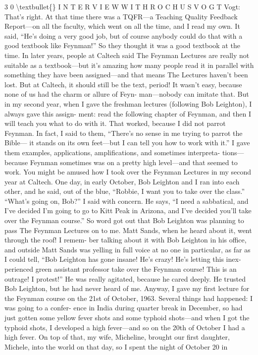 \documentclass[10pt,oneside]{article}
\begin{document}
3 0 \textbackslash{}textbullet\{\} I N T E R V I E W  W I T H  R O C H U S  V O G T Vogt: That’s right. At that time there was a TQFR---a Teaching Quality Feedback Report---on all the faculty, which went on all the time, and I read my own. It said, “He’s doing a very good job, but of course anybody could do that with a good textbook like Feynman!” So they thought it was a good textbook at the time. In later years, people at Caltech said The Feynman Lectures are really not suitable as a textbook---but it’s amazing how many people read it in parallel with something they have been assigned---and that means The Lectures haven’t been lost. But at Caltech, it should still be the text, period! It wasn’t easy, because none of us had the charm or allure of Feyn- man---nobody can imitate that. But in my second year, when I gave the freshman lectures (following Bob Leighton), I always gave this assign- ment: read the following chapter of Feynman, and then I will teach you what to do with it. That worked, because I did not parrot Feynman. In fact, I said to them, “There’s no sense in me trying to parrot the Bible--- it stands on its own feet---but I can tell you how to work with it.” I gave them examples, applications, amplifications, and sometimes interpreta- tions---because Feynman sometimes was on a pretty high level---and that seemed to work. You might be amused how I took over the Feynman Lectures in my second year at Caltech. One day, in early October, Bob Leighton and I ran into each other, and he said, out of the blue, “Robbie, I want you to take over the class.” “What’s going on, Bob?” I said with concern. He says, “I need a sabbatical, and I’ve decided I’m going to go to Kitt Peak in Arizona, and I’ve decided you’ll take over the Feynman course.” So word got out that Bob Leighton was planning to pass The Feynman Lectures on to me. Matt Sands, when he heard about it, went through the roof! I remem- ber talking about it with Bob Leighton in his office, and outside Matt Sands was yelling in full voice at no one in particular, as far as I could tell, “Bob Leighton has gone insane! He’s crazy! He’s letting this inex- perienced green assistant professor take over the Feynman course! This is an outrage! I protest!” He was really agitated, because he cared deeply. He trusted Bob Leighton, but he had never heard of me. Anyway, I gave my first lecture for the Feynman course on the 21st of October, 1963. Several things had happened: I was going to a confer- ence in India during quarter break in December, so had just gotten some yellow fever shots and some typhoid shots---and when I got the typhoid shots, I developed a high fever---and so on the 20th of October I had a high fever. On top of that, my wife, Micheline, brought our first daughter, Michele, into the world on that day, so I spent the night of October 20 in\par
\end{document}
